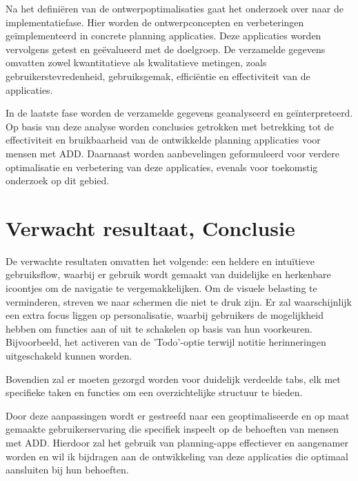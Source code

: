Na het definiëren van de ontwerpoptimalisaties gaat het onderzoek over naar de implementatiefase. Hier worden de ontwerpconcepten en verbeteringen geïmplementeerd in concrete planning applicaties. Deze applicaties worden vervolgens getest en geëvalueerd met de doelgroep. De verzamelde gegevens omvatten zowel kwantitatieve als kwalitatieve metingen, zoals gebruikerstevredenheid, gebruiksgemak, efficiëntie en effectiviteit van de applicaties. \newline 

In de laatste fase worden de verzamelde gegevens geanalyseerd en geïnterpreteerd. Op basis van deze analyse worden conclusies getrokken met betrekking tot de effectiviteit en bruikbaarheid van de ontwikkelde planning applicaties voor mensen met ADD. Daarnaast worden aanbevelingen geformuleerd voor verdere optimalisatie en verbetering van deze applicaties, evenals voor toekomstig onderzoek op dit gebied.


\section{Verwacht resultaat, Conclusie}%
\label{sec:verwachte_resultaten_conclusie}

De verwachte resultaten omvatten het volgende: een heldere en intuïtieve gebruiksflow, waarbij er gebruik wordt gemaakt van duidelijke en herkenbare icoontjes om de navigatie te vergemakkelijken. Om de visuele belasting te verminderen, streven we naar schermen die niet te druk zijn. \newline
Er zal waarschijnlijk een extra focus liggen op personalisatie, waarbij gebruikers de mogelijkheid hebben om functies aan of uit te schakelen op basis van hun voorkeuren. Bijvoorbeeld, het activeren van de 'Todo'-optie terwijl notitie herinneringen uitgeschakeld kunnen worden. \newline

Bovendien zal er moeten gezorgd worden voor duidelijk verdeelde tabs, elk met specifieke taken en functies om een overzichtelijke structuur te bieden. \newline
 
Door deze aanpassingen wordt er gestreefd naar een geoptimaliseerde en op maat gemaakte gebruikerservaring die specifiek inspeelt op de behoeften van mensen met ADD. Hierdoor zal het gebruik van planning-apps effectiever en aangenamer worden en wil ik bijdragen aan de ontwikkeling van deze applicaties die optimaal aansluiten bij hun behoeften.

